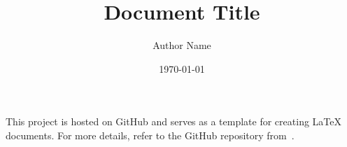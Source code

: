\documentclass[twoside, 11pt]{article}
\title{Document Title}
\author{Author Name}
\date{\today}
\begin{document}
  \maketitle

  

  \setcounter{tocdepth}{2}
  \tableofcontents

  \newpage

  This project is hosted on GitHub and serves as a template for creating {\LaTeX} documents. 
  For more details, refer to the GitHub repository from~\cite{chang2025document}.

  

  
  \newpage
  
  \pagestyle{plain}
  \printbibliography{}
\end{document}
